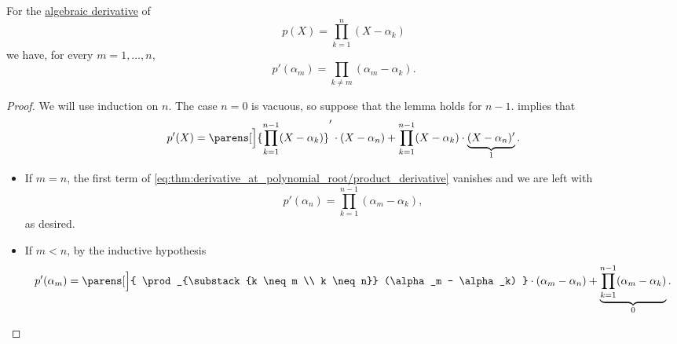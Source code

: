 \begin{lemma}\label{thm:derivative_at_polynomial_root}
  For the \hyperref[def:algebraic_derivative]{algebraic derivative} of
  \begin{equation*}
    p(X) = \prod_{k=1}^n (X - \alpha_k)
  \end{equation*}
  we have, for every \( m = 1, \ldots, n \),
  \begin{equation}\label{eq:thm:derivative_at_polynomial_root}
    p'(\alpha_m) = \prod_{k \neq m} (\alpha_m - \alpha_k).
  \end{equation}
\end{lemma}
\begin{proof}
  We will use induction on \( n \). The case \( n = 0 \) is vacuous, so suppose that the lemma holds for \( n - 1 \).  implies that
  \begin{equation}\label{eq:thm:derivative_at_polynomial_root/product_derivative}
    p'(X) = \parens[\Big]{ \prod_{k=1}^{n-1} (X - \alpha_k) }' \cdot (X - \alpha_n) + \prod_{k=1}^{n-1} (X - \alpha_k) \cdot \underbrace{(X - \alpha_n)'}_{1}.
  \end{equation}

  \begin{itemize}
    \item If \( m = n \), the first term of \eqref{eq:thm:derivative_at_polynomial_root/product_derivative} vanishes and we are left with
    \begin{equation*}
      p'(\alpha_n) = \prod_{k=1}^{n-1} (\alpha_m - \alpha_k),
    \end{equation*}
    as desired.

    \item If \( m < n \), by the inductive hypothesis
    \begin{equation*}
      p'(\alpha_m) = \parens[\Big]{ \prod_{\substack{k \neq m \\ k \neq n}} (\alpha_m - \alpha_k) } \cdot (\alpha_m - \alpha_n) + \underbrace{\prod_{k=1}^{n-1} (\alpha_m - \alpha_k)}_{0}.
    \end{equation*}
  \end{itemize}
\end{proof}

